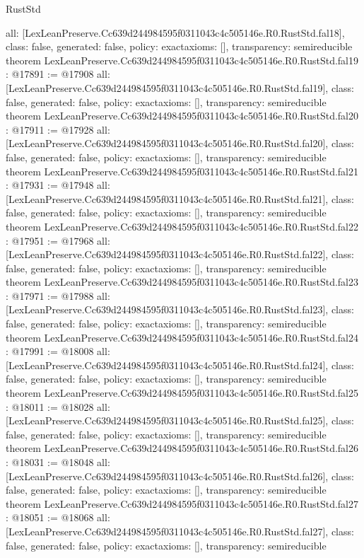 \begin{lexlean}{RustStd}
\begin{coremodule}
{  all: [LexLeanPreserve.Cc639d244984595f0311043c4c505146e.R0.RustStd.fal18],
  class: false,
  generated: false,
  policy: exact{axioms: []},
  transparency: semireducible
}
theorem LexLeanPreserve.Cc639d244984595f0311043c4c505146e.R0.RustStd.fal19 : @17891 := @17908 {
  all: [LexLeanPreserve.Cc639d244984595f0311043c4c505146e.R0.RustStd.fal19],
  class: false,
  generated: false,
  policy: exact{axioms: []},
  transparency: semireducible
}
theorem LexLeanPreserve.Cc639d244984595f0311043c4c505146e.R0.RustStd.fal20 : @17911 := @17928 {
  all: [LexLeanPreserve.Cc639d244984595f0311043c4c505146e.R0.RustStd.fal20],
  class: false,
  generated: false,
  policy: exact{axioms: []},
  transparency: semireducible
}
theorem LexLeanPreserve.Cc639d244984595f0311043c4c505146e.R0.RustStd.fal21 : @17931 := @17948 {
  all: [LexLeanPreserve.Cc639d244984595f0311043c4c505146e.R0.RustStd.fal21],
  class: false,
  generated: false,
  policy: exact{axioms: []},
  transparency: semireducible
}
theorem LexLeanPreserve.Cc639d244984595f0311043c4c505146e.R0.RustStd.fal22 : @17951 := @17968 {
  all: [LexLeanPreserve.Cc639d244984595f0311043c4c505146e.R0.RustStd.fal22],
  class: false,
  generated: false,
  policy: exact{axioms: []},
  transparency: semireducible
}
theorem LexLeanPreserve.Cc639d244984595f0311043c4c505146e.R0.RustStd.fal23 : @17971 := @17988 {
  all: [LexLeanPreserve.Cc639d244984595f0311043c4c505146e.R0.RustStd.fal23],
  class: false,
  generated: false,
  policy: exact{axioms: []},
  transparency: semireducible
}
theorem LexLeanPreserve.Cc639d244984595f0311043c4c505146e.R0.RustStd.fal24 : @17991 := @18008 {
  all: [LexLeanPreserve.Cc639d244984595f0311043c4c505146e.R0.RustStd.fal24],
  class: false,
  generated: false,
  policy: exact{axioms: []},
  transparency: semireducible
}
theorem LexLeanPreserve.Cc639d244984595f0311043c4c505146e.R0.RustStd.fal25 : @18011 := @18028 {
  all: [LexLeanPreserve.Cc639d244984595f0311043c4c505146e.R0.RustStd.fal25],
  class: false,
  generated: false,
  policy: exact{axioms: []},
  transparency: semireducible
}
theorem LexLeanPreserve.Cc639d244984595f0311043c4c505146e.R0.RustStd.fal26 : @18031 := @18048 {
  all: [LexLeanPreserve.Cc639d244984595f0311043c4c505146e.R0.RustStd.fal26],
  class: false,
  generated: false,
  policy: exact{axioms: []},
  transparency: semireducible
}
theorem LexLeanPreserve.Cc639d244984595f0311043c4c505146e.R0.RustStd.fal27 : @18051 := @18068 {
  all: [LexLeanPreserve.Cc639d244984595f0311043c4c505146e.R0.RustStd.fal27],
  class: false,
  generated: false,
  policy: exact{axioms: []},
  transparency: semireducible
}
\end{coremodule}
\end{lexlean}
